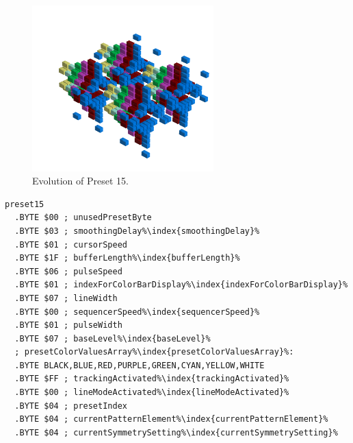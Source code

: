\clearpage
\begin{minipage}[b]{0.48\linewidth}
\begin{figure}[H]                                                          
  \centering                                                             
  \begin{adjustbox}{width=7cm,center}                                   
  \includegraphics[width=7cm]{src/presets/pattern15-45.png}%
  \end{adjustbox}                                                        
\caption{Evolution of Preset 15.}                                           
\end{figure}                                                               
                                                                 
                                                                           
\end{minipage}
\hspace{0.1cm}
\begin{minipage}[b]{0.48\linewidth}                                       
\begin{lstlisting}[basicstyle=\ttfamily\scriptsize,caption=Data structure for Preset 15.,escapechar=\%]
preset15
  .BYTE $00 ; unusedPresetByte
  .BYTE $03 ; smoothingDelay%\index{smoothingDelay}%
  .BYTE $01 ; cursorSpeed
  .BYTE $1F ; bufferLength%\index{bufferLength}%
  .BYTE $06 ; pulseSpeed
  .BYTE $01 ; indexForColorBarDisplay%\index{indexForColorBarDisplay}%
  .BYTE $07 ; lineWidth
  .BYTE $00 ; sequencerSpeed%\index{sequencerSpeed}%
  .BYTE $01 ; pulseWidth
  .BYTE $07 ; baseLevel%\index{baseLevel}%
  ; presetColorValuesArray%\index{presetColorValuesArray}%: 
  .BYTE BLACK,BLUE,RED,PURPLE,GREEN,CYAN,YELLOW,WHITE
  .BYTE $FF ; trackingActivated%\index{trackingActivated}%
  .BYTE $00 ; lineModeActivated%\index{lineModeActivated}%
  .BYTE $04 ; presetIndex
  .BYTE $04 ; currentPatternElement%\index{currentPatternElement}%
  .BYTE $04 ; currentSymmetrySetting%\index{currentSymmetrySetting}%
\end{lstlisting}
\end{minipage}


